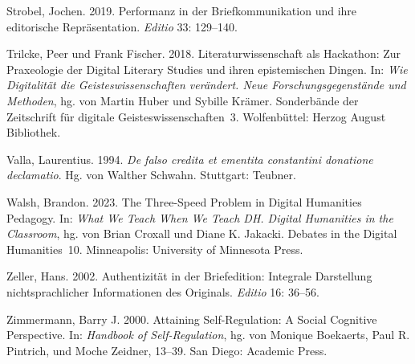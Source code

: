 \documentclass[
          a4paper,
        ]{article}
\newlength{\cslhangindent}
\newenvironment{CSLReferences}[2] %
 {\begin{list}{}{%
  \setlength{\itemindent}{0pt}
  \setlength{\leftmargin}{0pt}
  \setlength{\parsep}{0pt}
  \ifodd #1
   \setlength{\leftmargin}{\cslhangindent}
   \setlength{\itemindent}{-1\cslhangindent}
  \fi
  \setlength{\itemsep}{#2\baselineskip}}}
 {\end{list}}
\begin{document}
\begin{CSLReferences}{1}{0}
Strobel, Jochen. 2019. Performanz in der Briefkommunikation und ihre
editorische Repräsentation. \emph{Editio} 33: 129--140.

Trilcke, Peer und Frank Fischer. 2018. Literaturwissenschaft als
Hackathon: Zur Praxeologie der Digital Literary Studies und ihren
epistemischen Dingen. In: \emph{Wie Digitalität die
Geisteswissenschaften verändert. Neue Forschungsgegenstände und
Methoden}, hg. von Martin Huber und Sybille Krämer. Sonderbände der
Zeitschrift für digitale Geisteswissenschaften~3. Wolfenbüttel: Herzog
August Bibliothek.

Valla, Laurentius. 1994. \emph{De falso credita et ementita constantini
donatione declamatio}. Hg. von Walther Schwahn. Stuttgart: Teubner.

Walsh, Brandon. 2023. The Three-Speed Problem in Digital Humanities
Pedagogy. In: \emph{What We Teach When We Teach DH. Digital Humanities
in the Classroom}, hg. von Brian Croxall und Diane K. Jakacki. Debates
in the Digital Humanities~10. Minneapolis: University of Minnesota
Press.

Zeller, Hans. 2002. Authentizität in der Briefedition: Integrale
Darstellung nichtsprachlicher Informationen des Originals. \emph{Editio}
16: 36--56.

Zimmermann, Barry J. 2000. Attaining Self-Regulation: A Social Cognitive
Perspective. In: \emph{Handbook of Self-Regulation}, hg. von Monique
Boekaerts, Paul R. Pintrich, und Moche Zeidner, 13--39. San Diego:
Academic Press.

\end{CSLReferences}
\end{document}
